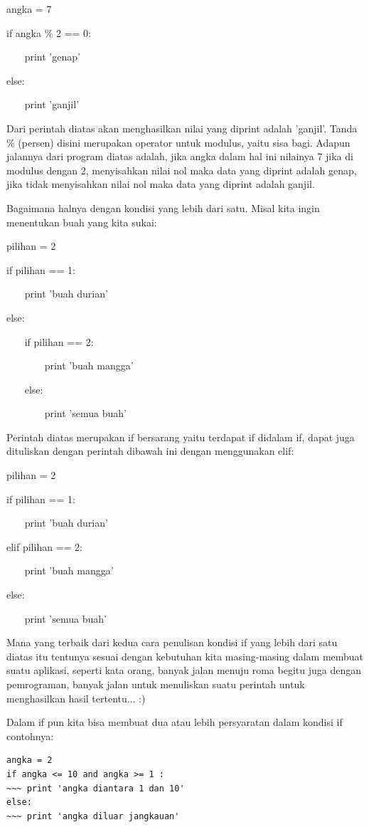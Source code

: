  
angka = 7 

 
if angka    \%   2 == 0: 

 
~~~ print 'genap' 

 
else: 

 
~~~ print 'ganjil' 

 
Dari perintah diatas akan menghasilkan nilai yang diprint adalah 'ganjil'. Tanda      \%     (persen) disini merupakan operator untuk modulus, yaitu sisa bagi. Adapun jalannya dari program diatas adalah, jika angka dalam hal ini nilainya 7 jika di modulus dengan 2, menyisahkan nilai nol maka data yang diprint adalah genap, jika tidak menyisahkan nilai nol maka data yang diprint adalah ganjil. 

 
Bagaimana halnya dengan kondisi yang lebih dari satu. Misal kita ingin menentukan buah yang kita sukai: 

 
pilihan = 2 

 
if pilihan == 1: 

 
~~~ print 'buah durian' 

 
else: 

 
~~~ if pilihan == 2: 

 
~~~~~~~ print 'buah mangga' 

 
~~~ else: 

 
~~~~~~~ print 'semua buah' 

 
Perintah diatas merupakan if bersarang yaitu terdapat if didalam if, dapat juga dituliskan dengan perintah dibawah ini dengan menggunakan $  $elif: 

 
pilihan = 2 

 
if pilihan == 1: 

 
~~~ print 'buah durian' 

 
elif pilihan == 2: 

 
~~~ print 'buah mangga' 

 
else: 

 
~~~ print 'semua buah' 

 
Mana yang terbaik dari kedua cara penulisan kondisi if yang lebih dari satu diatas itu tentunya sesuai dengan kebutuhan kita masing-masing dalam membuat suatu aplikasi, seperti kata orang, banyak jalan menuju roma begitu juga dengan pemrograman, banyak jalan untuk menuliskan suatu perintah untuk menghasilkan hasil tertentu... :) 

 
Dalam if pun kita bisa membuat dua atau lebih persyaratan dalam kondisi   if   contohnya: 

 
\begin{verbatim}
angka = 2  
if angka <= 10 and angka >= 1 : 
~~~ print 'angka diantara 1 dan 10' 
else:  
~~~ print 'angka diluar jangkauan' 
\end{verbatim}



